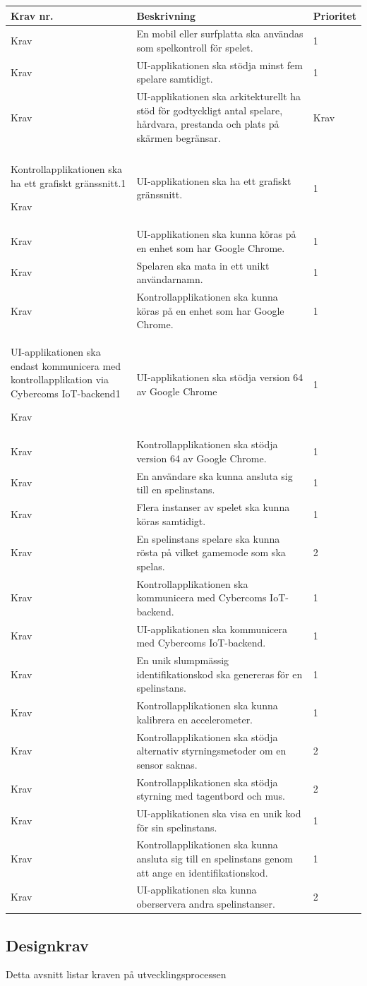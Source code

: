 \documentclass[10pt]{article}
\newcounter{indexcounter}
\newcommand{\Krav}[2]{
	\stepcounter{indexcounter}
	Krav \arabic{indexcounter} & #1 & #2 \\ \hline
}
\begin{document}
	\begin{tabular}{| p{2cm} | p{8cm} | p{2cm}|}
		\hline
		
		\textbf{Krav nr.} & \textbf{Beskrivning} &\textbf{Prioritet} \\ \hline
		\Krav{En mobil eller surfplatta ska användas som spelkontroll för spelet.}{1}
		\Krav{UI-applikationen ska stödja minst fem spelare samtidigt.}{1}
        \Krav{UI-applikationen ska arkitekturellt ha stöd för godtyckligt antal spelare, hårdvara, prestanda och plats på skärmen begränsar.}
		\Krav{Kontrollapplikationen ska ha ett grafiskt gränssnitt.}{1}
		\Krav{UI-applikationen ska ha ett grafiskt gränssnitt.}{1}
		\Krav{UI-applikationen ska kunna köras på en enhet som har Google Chrome.}{1}
        \Krav{Spelaren ska mata in ett unikt användarnamn.}{1}
		\Krav{Kontrollapplikationen ska kunna köras på en enhet som har Google Chrome.}{1}
		\Krav{UI-applikationen ska endast kommunicera med \newline kontrollapplikation via  Cybercoms IoT-backend}{1}
		\Krav{UI-applikationen ska stödja version 64 av Google Chrome}{1}
		\Krav{Kontrollapplikationen ska stödja version 64 av Google Chrome.}{1}
		\Krav{En användare ska kunna ansluta sig till en spelinstans.}{1}
		\Krav{Flera instanser av spelet ska kunna köras samtidigt.}{1}
		\Krav{En spelinstans spelare ska kunna rösta på vilket gamemode som ska spelas.}{2}
		\Krav{Kontrollapplikationen ska kommunicera med Cybercoms IoT-backend.}{1}
		\Krav{UI-applikationen ska kommunicera med Cybercoms IoT-backend.}{1}
		\Krav{En unik slumpmässig identifikationskod ska genereras för en spelinstans.}{1}
		\Krav{Kontrollapplikationen ska kunna kalibrera en accelerometer.}{1}
		\Krav{Kontrollapplikationen ska stödja alternativ styrningsmetoder om en sensor saknas.}{2}
		\Krav{Kontrollapplikationen ska stödja styrning med tagentbord och mus.}{2}
		\Krav{UI-applikationen ska visa en unik kod för sin spelinstans.}{1}
		\Krav{Kontrollapplikationen ska kunna ansluta sig till en spelinstans genom att ange en identifikationskod.}{1}
		\Krav{UI-applikationen ska kunna oberservera andra spelinstanser.}{2}
						
	\end{tabular}
	
	\subsection{Designkrav}
	Detta avsnitt listar kraven på utvecklingsprocessen
	
\end{document}
